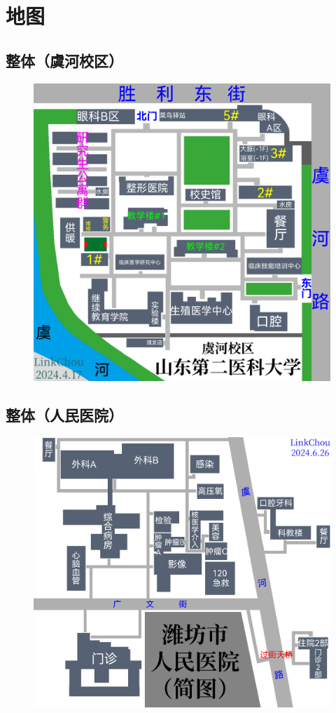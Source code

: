 \newpage
\section[地图]{地图}

\subsection[整体（虞河校区）]{整体（虞河校区）}
\noindent\begin{figure}[H]
    \centering
    \vspace{5em}
    \noindent\includegraphics*[width=\linewidth]{resources/map/虞河校区.pdf}
    \label{map_yuhe_holistic}
\end{figure}

\newpage
\subsection[整体（人民医院）]{整体（人民医院）}
\noindent\begin{figure}[H]
    \centering
    \vspace{8em}
    \noindent\includegraphics*[width=\linewidth]{resources/map/人民医院.pdf}
    \label{map_yuhe_renmin_hospital}
\end{figure}

\newpage